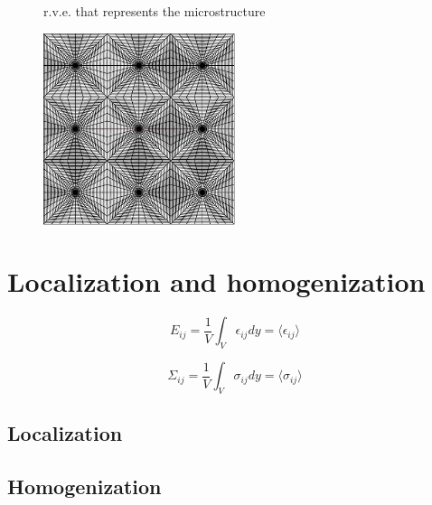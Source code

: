\begin{figure}[h!]
\resizebox{6cm}{!}{
 
}
\caption{r.v.e. that represents the microstructure}
\label{fig_rve_measures}
\end{figure}


\begin{figure}[h!]
\resizebox{2cm}{!}{
 
}
\end{figure}

\begin{figure}[h!]
\resizebox{5cm}{!}{
 
}
\end{figure}

\begin{figure}[h!]
  \includegraphics[width=0.5\textwidth]{figures/mesh-struc.pdf}
\end{figure}

\section{Localization and homogenization}

\begin{equation}
E_{ij} = \frac{1}{V}\int_{V}\epsilon_{ij}dy = \langle \epsilon_{ij} \rangle
\end{equation}

\begin{equation}
\Sigma_{ij} = \frac{1}{V}\int_{V}\sigma_{ij}dy = \langle \sigma_{ij} \rangle
\end{equation}

\subsection{Localization}


\subsection{Homogenization}



